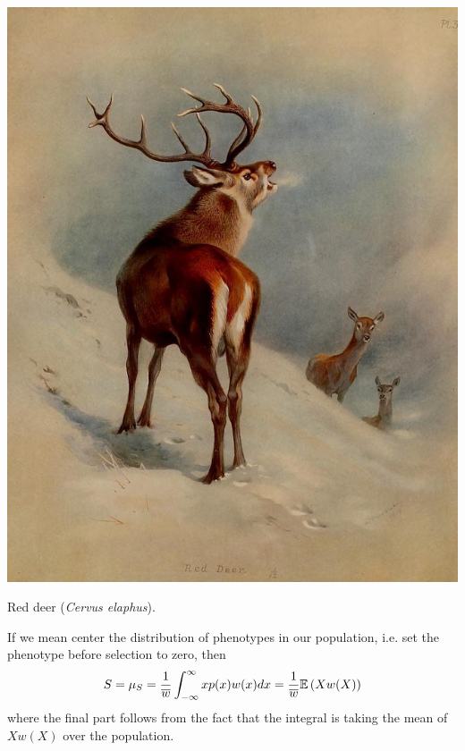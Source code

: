\begin{marginfigure}
  \begin{center}
    \includegraphics[width= \textwidth]{illustration_images/Quant_gen/red_deer/Red_deer.png}
\end{center}
\caption{Red deer ({\it Cervus elaphus}). } \label{fig:red_deer}  
\end{marginfigure}

If we mean center the distribution of phenotypes in our population, i.e. set the phenotype before
selection to zero, then
\begin{equation}
S=\mu_S= \frac{1}{\overline{w}}\int_{-\infty}^{\infty} x p(x) w(x) dx = \frac{1}{\overline{w}}\mathbb{E} \left (X
  w(X) \right)
\end{equation}
where the final part follows from the fact that the integral is taking
the mean of $X w(X)$ over the population.

